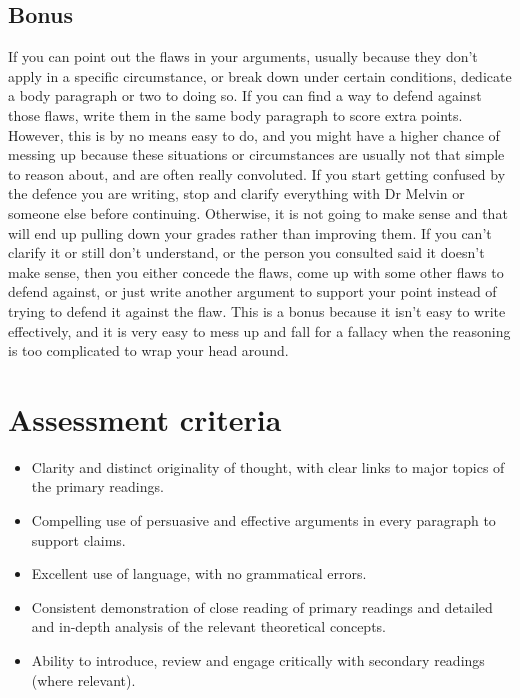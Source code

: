 \documentclass[11pt]{article}
\begin{document}
\subsection{Bonus}
\label{sec:org04a3c8d}
If you can point out the flaws in your arguments, usually because they don't apply in a specific circumstance, or break down under certain conditions, dedicate a body paragraph or two to doing so. If you can find a way to defend against those flaws, write them in the same body paragraph to score extra points. However, this is by no means easy to do, and you might have a higher chance of messing up because these situations or circumstances are usually not that simple to reason about, and are often really convoluted. If you start getting confused by the defence you are writing, stop and clarify everything with Dr Melvin or someone else before continuing. Otherwise, it is not going to make sense and that will end up pulling down your grades rather than improving them. If you can't clarify it or still don't understand, or the person you consulted said it doesn't make sense, then you either concede the flaws, come up with some other flaws to defend against, or just write another argument to support your point instead of trying to defend it against the flaw. This is a bonus because it isn't easy to write effectively, and it is very easy to mess up and fall for a fallacy when the reasoning is too complicated to wrap your head around.

 \newpage
\section{Assessment criteria}
\label{sec:orgac29d8b}
\begin{itemize}
\item Clarity and distinct originality of thought, with clear links to major topics of the primary readings.
\item Compelling use of persuasive and effective arguments in every paragraph to support claims.
\item Excellent use of language, with no grammatical errors.
\item Consistent demonstration of close reading of primary readings and detailed and in-depth analysis of the relevant theoretical concepts.
\item Ability to introduce, review and engage critically with secondary readings (where relevant).
\end{itemize}

 \newpage
\end{document}
